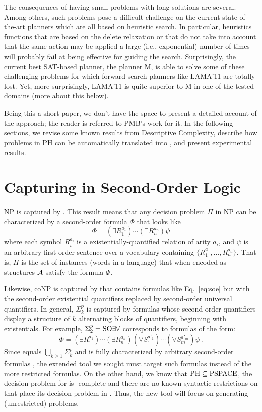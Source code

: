 The consequences of having small problems with long solutions
are several. Among others, such problems pose a difficult
challenge on the current state-of-the-art planners which are
all based on heuristic search. In particular, heuristics functions
that are based on the delete relaxation or that do not take into
account that the same action may be applied a large (i.e., exponential)
number of times will probably fail at being effective for guiding
the search.
Surprisingly, the current best SAT-based planner, the planner M,
is able to solve some of these challenging
\STRIPS problems for which forward-search planners like LAMA'11
are totally lost. Yet, more surprisingly, LAMA'11 is quite
superior to M in one of the tested domains (more about this below).

Being this a short paper, we don't have the space to present
a detailed account of the approach; the reader is referred
to PMB's work for it.
In the following sections, we revise some known results from
Descriptive Complexity, describe how problems in PH can be
automatically translated into \STRIPS, and present experimental
results.

\section{Capturing \PH in Second-Order Logic}

NP is captured by \SOE \cite{fagin:spectra}.
This result means that any decision problem $\Pi$ in NP can be
characterized by a second-order formula $\Phi$ that looks like
\begin{equation}
\label{eq:soe}
\Phi = (\exists R_1^{a_1})\cdots(\exists R_n^{a_n})\psi
\end{equation}
where each symbol $R_i^{a_i}$ is a existentially-quantified relation
of arity $a_i$, and $\psi$ is an arbitrary first-order sentence 
over a vocabulary containing $\{R_1^{a_1},\ldots,R_n^{a_n}\}$.
That is, $\Pi$ is the set of instances (words in a language)
that when encoded as structures $\mathcal{A}$ satisfy the formula $\Phi$.

Likewise, coNP is captured by \SOA that contains formulas
like Eq.~\eqref{eq:soe} but with the second-order existential
quantifiers replaced by second-order universal quantifiers.
In general, $\Sigma^p_k$ is captured by formulas
whose second-order quantifiers display a structure of $k$
alternating blocks of quantifiers, beginning with existentials.
For example, $\Sigma^p_2=\text{SO}\exists\forall$ corresponds to formulas of
the form:
\begin{equation}
\Phi = (\exists R_1^{a_1}) \cdots (\exists R_n^{a_n}) 
       (\forall S_1^{a'_1}) \cdots (\forall S_m^{a'_m})
       \psi \,.
\end{equation}
Since \PH equals $\bigcup_{k\geq 1}\Sigma^p_k$ and is
fully characterized by arbitrary second-order formulas \cite{immerman:book},
the extended tool we sought must target such formulas
instead of the more restricted \SOE formulas.
On the other hand, we know that $\text{PH}\subseteq\text{PSPACE}$, the
decision problem for \STRIPS is \PSPACE-complete and there
are no known syntactic restrictions on \STRIPS that place
its decision problem in \PH. Thus, the new tool will focus
on generating (unrestricted) \STRIPS problems.

